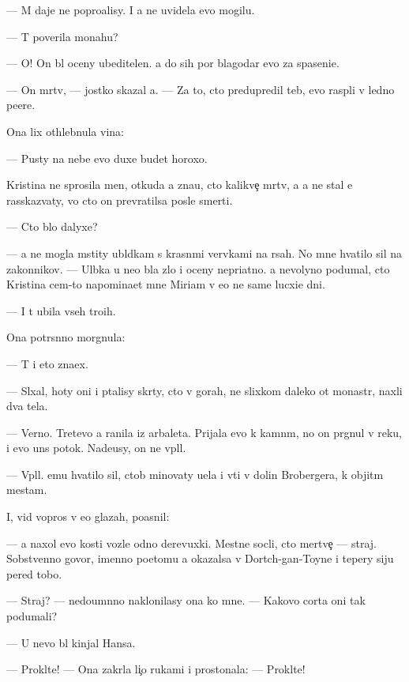 \documentclass[10pt]{book}
\begin{document}
— M{\yi} daje ne popro{\x}alisy. I {\y}a ne uvidela {\y}evo mogilu.

— T{\yi} poverila monahu?

— O! On b{\yi}l oceny ubeditelen. {\Y}a do sih por blagodar{\iu} {\y}evo za spaseni{\y}e.

— On m{\e}rtv, — jostko skazal {\y}a. — Za to, cto predupredil teb{\ia}, {\y}evo rasp{\ia}li v led{\ia}no{\y} pe{\x}ere.

Ona lix othlebnula vina:

— Pusty na nebe {\y}evo duxe budet horoxo.

Kristina ne sprosila men{\ia}, otkuda {\y}a zna{\y}u, cto kalikve{\c} m{\e}rtv, a {\y}a ne stal {\y}e{\y} rasskaz{\yi}vaty, vo cto on prevratilsa posle smerti.

— Cto b{\yi}lo dalyxe?

— {\Y}a ne mogla mstity ubl{\iu}dkam s krasn{\yi}mi ver{\e}vkami na r{\ia}sah. No mne hvatilo sil na zakonnikov. — Ul{\yi}bka u ne{\y}o b{\yi}la zlo{\y} i oceny nepri{\y}atno{\y}. {\Y}a nevolyno podumal, cto Kristina cem-to napomina{\y}et mne Miriam v {\y}e{\y}o ne sam{\yi}{\y}e lucxi{\y}e dni.

— I t{\yi} ubila vseh tro{\y}ih.

Ona potr{\ia}s{\e}nno morgnula:

— T{\yi} i eto zna{\y}ex.

— Sl{\yi}xal, hoty oni i p{\yi}talisy skr{\yi}ty, cto v gorah, ne slixkom daleko ot monast{\yi}r{\ia}, naxli dva tela.

— Verno. Tret{\y}evo {\y}a ranila iz arbaleta. Prijala {\y}evo k kamn{\ia}m, no on pr{\yi}gnul v reku, i {\y}evo un{\e}s potok. Nade{\y}usy, on ne v{\yi}pl{\yi}l.

— V{\yi}pl{\yi}l. {\Y}emu hvatilo sil, ctob{\yi} minovaty u{\x}el{\y}a i v{\yi}{\y}ti v dolin{\yi} Brobergera, k objit{\yi}m mestam.

I, vid{\ia} vopros v {\y}e{\y}o glazah, po{\y}asnil:

— {\Y}a naxol {\y}evo kosti vozle odno{\y} derevuxki. Mestn{\yi}{\y}e socli, cto mertve{\c} — straj. Sobstvenno govor{\ia}, imenno poetomu {\y}a okazalsa v Dortch-gan-Toyne i tepery siju pered tobo{\y}.

— Straj? — nedoum{\e}nno naklonilasy ona ko mne. — Kakovo corta oni tak podumali?

— U nevo b{\yi}l kinjal Hansa.

— Prokl{\ia}t{\y}e! — Ona zakr{\yi}la li{\c}o rukami i prostonala: — Prokl{\ia}t{\y}e!
\end{document}
